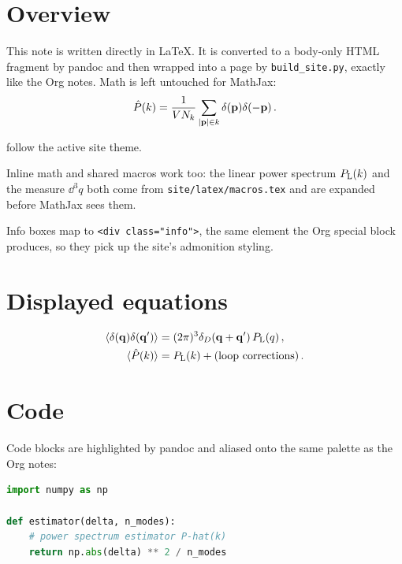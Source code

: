 \documentclass{article}
\begin{document}
\section{Overview}

This note is written directly in LaTeX. It is converted to a body-only HTML
fragment by pandoc and then wrapped into a page by \texttt{build\_site.py},
exactly like the Org notes. Math is left untouched for MathJax:
%
\[ \hat{P}(k) = \frac{1}{V N_k} \sum_{|\mathbf{p}| \in k} \delta(\mathbf{p}) \delta(-\mathbf{p}) \,. \]

 follow the active site theme.

Inline math and shared macros work too: the linear power spectrum
\(P_{\mathrm{L}}(k)\) and the measure \(\dd^3 q\) both come from
\texttt{site/latex/macros.tex} and are expanded before MathJax sees them.

\begin{info}
Info boxes map to \verb|<div class="info">|, the same element the Org
special block produces, so they pick up the site's admonition styling.
\end{info}

\section{Displayed equations}

\begin{align}
  \langle \delta(\mathbf{q}) \delta(\mathbf{q}') \rangle &= (2\pi)^3 \delta_D(\mathbf{q} + \mathbf{q}') \, P_{\mathrm{L}}(q) \,, \\
  \langle \hat{P}(k) \rangle &= P_{\mathrm{L}}(k) + \text{(loop corrections)} \,.
\end{align}

\section{Code}

Code blocks are highlighted by pandoc and aliased onto the same palette as
the Org notes:

\begin{lstlisting}[language=Python]
import numpy as np

def estimator(delta, n_modes):
    # power spectrum estimator P-hat(k)
    return np.abs(delta) ** 2 / n_modes
\end{lstlisting}
\end{document}
